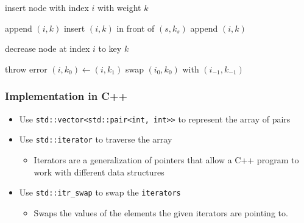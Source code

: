 \documentclass[a4paper]{beamer}
\begin{document}
\begin{frame}
\begin{algorithm}[H]
		\caption{insert node with index $i$ with weight $k$}
		\begin{algorithmic}[1]
			\State append \( (i,k) \)  
			\Else
			\State insert \( (i,k) \) in front of \( (s,k_s) \) 
			\State \Return
			\EndIf
			\EndWhile
			\State append \( (i,k) \) 
			\EndIf
		\EndFunction
		\end{algorithmic}
	\end{algorithm}
\end{frame}

\begin{frame}
	\begin{algorithm}[H]
		\caption{decrease node at index \( i \) to key \( k \)}
		\begin{algorithmic}[1]
			\State throw error
			\Else
			\State \( (i, k_0) \leftarrow (i, k_1) \)  
			\State swap \( (i_0, k_0) \) with \( (i_{-1}, k_{-1}) \) 
			\EndWhile
			\EndIf
			\EndFunction
		\end{algorithmic}
	\end{algorithm}	
\end{frame}

\begin{frame}
	\frametitle{Implementation in C++}
	\begin{itemize}
		\item Use \texttt{std::vector<std::pair<int, int>>} to represent the array of pairs
		\item Use \texttt{std::iterator} to traverse the array 
		\begin{itemize}
			\item Iterators are a generalization of pointers that allow a C++ program to work with different data structures
		\end{itemize}
		\item Use \texttt{std::itr\_swap} to swap the \texttt{iterators} 
		\begin{itemize}
			\item Swaps the values of the elements the given iterators are pointing to.
		\end{itemize}	
	\end{itemize}
\end{frame}
\end{document}
